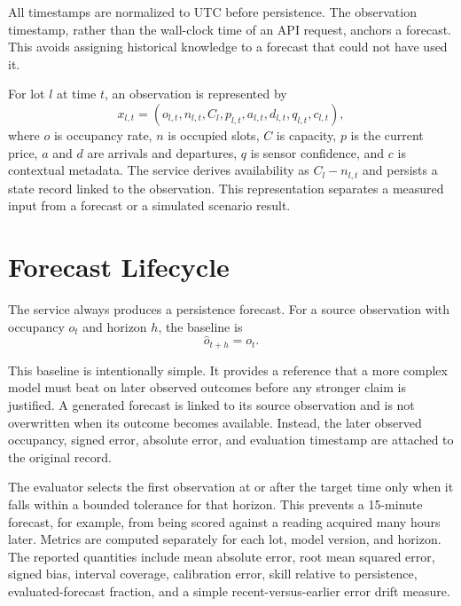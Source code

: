\documentclass[conference]{IEEEtran}
\begin{document}
All timestamps are normalized to UTC before persistence. The observation timestamp, rather than the wall-clock time of an API request, anchors a forecast. This avoids assigning historical knowledge to a forecast that could not have used it.

For lot $l$ at time $t$, an observation is represented by
\begin{equation}
x_{l,t}=(o_{l,t},n_{l,t},C_l,p_{l,t},a_{l,t},d_{l,t},q_{l,t},c_{l,t}),
\label{eq:observation}
\end{equation}
where $o$ is occupancy rate, $n$ is occupied slots, $C$ is capacity, $p$ is the current price, $a$ and $d$ are arrivals and departures, $q$ is sensor confidence, and $c$ is contextual metadata. The service derives availability as $C_l-n_{l,t}$ and persists a state record linked to the observation. This representation separates a measured input from a forecast or a simulated scenario result.

\section{Forecast Lifecycle}

The service always produces a persistence forecast. For a source observation with occupancy $o_t$ and horizon $h$, the baseline is
\begin{equation}
\hat{o}_{t+h}=o_t.
\label{eq:persistence}
\end{equation}

This baseline is intentionally simple. It provides a reference that a more complex model must beat on later observed outcomes before any stronger claim is justified. A generated forecast is linked to its source observation and is not overwritten when its outcome becomes available. Instead, the later observed occupancy, signed error, absolute error, and evaluation timestamp are attached to the original record.

The evaluator selects the first observation at or after the target time only when it falls within a bounded tolerance for that horizon. This prevents a 15-minute forecast, for example, from being scored against a reading acquired many hours later. Metrics are computed separately for each lot, model version, and horizon. The reported quantities include mean absolute error, root mean squared error, signed bias, interval coverage, calibration error, skill relative to persistence, evaluated-forecast fraction, and a simple recent-versus-earlier error drift measure.
\end{document}
